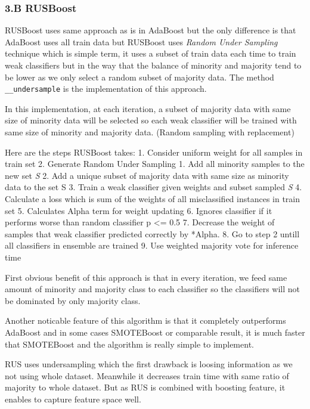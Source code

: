 \documentclass[11pt]{article}
\begin{document}
    \hypertarget{b-rusboost}{%
\subsubsection{3.B RUSBoost}\label{b-rusboost}}

RUSBoost uses same approach as is in AdaBoost but the only difference is
that AdaBoost uses all train data but RUSBoost uses \emph{Random Under
Sampling} technique which is simple term, it uses a subset of train data
each time to train weak classifiers but in the way that the balance of
minority and majority tend to be lower as we only select a random subset
of majority data. The method \texttt{\_\_undersample} is the
implementation of this approach.

In this implementation, at each iteration, a subset of majority data
with same size of minority data will be selected so each weak classifier
will be trained with same size of minority and majority data. (Random
sampling with replacement)

Here are the steps RUSBoost takes: 1. Consider uniform weight for all
samples in train set 2. Generate Random Under Sampling 1. Add all
minority samples to the new set \emph{S} 2. Add a unique subset of
majority data with same size as minority data to the set S 3. Train a
weak classifier given weights and subset sampled \emph{S} 4. Calculate a
loss which is sum of the weights of all misclassified instances in train
set 5. Calculates Alpha term for weight updating 6. Ignores classifier
if it performs worse than random classifier p \textless{}= 0.5 7.
Decrease the weight of samples that weak classifier predicted correctly
by *Alpha. 8. Go to step 2 untill all classifiers in ensemble are
trained 9. Use weighted majority vote for inference time

First obvious benefit of this approach is that in every iteration, we
feed same amount of minority and majority class to each classifier so
the classifiers will not be dominated by only majority class.

Another noticable feature of this algorithm is that it completely
outperforms AdaBoost and in some cases SMOTEBoost or comparable result,
it is much faster that SMOTEBoost and the algorithm is really simple to
implement.

RUS uses undersampling which the first drawback is loosing information
as we not using whole dataset. Meanwhile it decreases train time with
same ratio of majority to whole dataset. But as RUS is combined with
boosting feature, it enables to capture feature space well.
\end{document}
